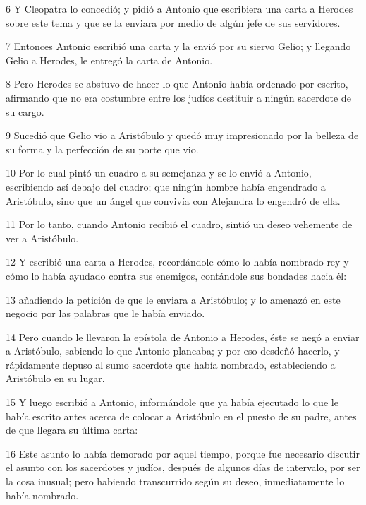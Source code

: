 \par 6 Y Cleopatra lo concedió; y pidió a Antonio que escribiera una carta a Herodes sobre este tema y que se la enviara por medio de algún jefe de sus servidores.

\par 7 Entonces Antonio escribió una carta y la envió por su siervo Gelio; y llegando Gelio a Herodes, le entregó la carta de Antonio.

\par 8 Pero Herodes se abstuvo de hacer lo que Antonio había ordenado por escrito, afirmando que no era costumbre entre los judíos destituir a ningún sacerdote de su cargo.

\par 9 Sucedió que Gelio vio a Aristóbulo y quedó muy impresionado por la belleza de su forma y la perfección de su porte que vio.

\par 10 Por lo cual pintó un cuadro a su semejanza y se lo envió a Antonio, escribiendo así debajo del cuadro; que ningún hombre había engendrado a Aristóbulo, sino que un ángel que convivía con Alejandra lo engendró de ella.

\par 11 Por lo tanto, cuando Antonio recibió el cuadro, sintió un deseo vehemente de ver a Aristóbulo.

\par 12 Y escribió una carta a Herodes, recordándole cómo lo había nombrado rey y cómo lo había ayudado contra sus enemigos, contándole sus bondades hacia él:

\par 13 añadiendo la petición de que le enviara a Aristóbulo; y lo amenazó en este negocio por las palabras que le había enviado.

\par 14 Pero cuando le llevaron la epístola de Antonio a Herodes, éste se negó a enviar a Aristóbulo, sabiendo lo que Antonio planeaba; y por eso desdeñó hacerlo, y rápidamente depuso al sumo sacerdote que había nombrado, estableciendo a Aristóbulo en su lugar.

\par 15 Y luego escribió a Antonio, informándole que ya había ejecutado lo que le había escrito antes acerca de colocar a Aristóbulo en el puesto de su padre, antes de que llegara su última carta:

\par 16 Este asunto lo había demorado por aquel tiempo, porque fue necesario discutir el asunto con los sacerdotes y judíos, después de algunos días de intervalo, por ser la cosa inusual; pero habiendo transcurrido según su deseo, inmediatamente lo había nombrado.

